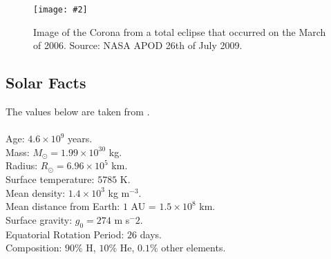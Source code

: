 \documentclass[12pt]{ociamthesis}
\newcommand{\mfig}[4]{
  \begin{figure}
  \begin{center}
  \texttt{[image: \#2]}
  \caption{#3}
  \label{#4}
  \end{center}
  \end{figure}}
\begin{document}
\mfig{0.65}{figures/corona_vangorp.png}{Image of the Corona from a total eclipse that occurred on the March of 2006. Source: NASA APOD 26th of July 2009.}{corona_image}
\subsection{Solar Facts}
The values below are taken from \citep{priest2014magnetohydrodynamics}.  \\ \\
Age: $4.6 \times 10^9$ years. \\
Mass: $M_{\odot}= 1.99 \times 10^{30}$ kg. \\
Radius: $R_{\odot} = 6.96 \times 10^5$ km. \\
Surface temperature: $5785$ K. \\
Mean density: $1.4 \times 10^3$ kg m$^{-3}$. \\
Mean distance from Earth: $1$ AU = $1.5 \times 10^8$ km. \\
Surface gravity: $g_{0}=274$ m s$^-2$. \\
Equatorial Rotation Period: $26$ days. \\
Composition: $90 \%$ H, $10 \%$ He, $0.1 \%$ other elements.    
\end{document}
